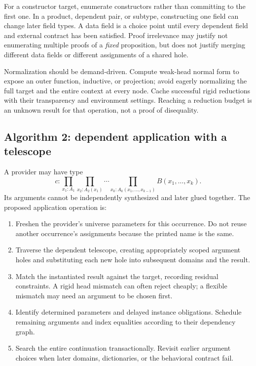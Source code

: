 \documentclass[11pt,letterpaper]{article}
\theoremstyle{definition}\newtheorem{definition}[theorem]{Definition}
\theoremstyle{remark}\newtheorem{remark}[theorem]{Remark}
\begin{document}
For a constructor target, enumerate constructors rather than committing to the
first one. In a product, dependent pair, or subtype, constructing one field can
change later field types. A data field is a choice point until every dependent
field and external contract has been satisfied. Proof irrelevance may justify
not enumerating multiple proofs of a \emph{fixed} proposition, but does not
justify merging different data fields or different assignments of a shared hole.

Normalization should be demand-driven. Compute weak-head normal form to expose
an outer function, inductive, or projection; avoid eagerly normalizing the full
target and the entire context at every node. Cache successful rigid reductions
with their transparency and environment settings. Reaching a reduction budget
is an unknown result for that operation, not a proof of disequality.

\subsection{Algorithm 2: dependent application with a telescope}

A provider may have type
\[
 c:\prod_{x_1:A_1}\prod_{x_2:A_2(x_1)}\cdots
       \prod_{x_k:A_k(x_1,\ldots,x_{k-1})}B(x_1,\ldots,x_k).
\]
Its arguments cannot be independently synthesized and later glued together.
The proposed application operation is:

\begin{enumerate}
\item Freshen the provider's universe parameters for this occurrence. Do not
reuse another occurrence's assignments because the printed name is the same.
\item Traverse the dependent telescope, creating appropriately scoped argument
holes and substituting each new hole into subsequent domains and the result.
\item Match the instantiated result against the target, recording residual
constraints. A rigid head mismatch can often reject cheaply; a flexible mismatch
may need an argument to be chosen first.
\item Identify determined parameters and delayed instance obligations. Schedule
remaining arguments and index equalities according to their dependency graph.
\item Search the entire continuation transactionally. Revisit earlier argument
choices when later domains, dictionaries, or the behavioral contract fail.
\end{enumerate}
\end{document}
